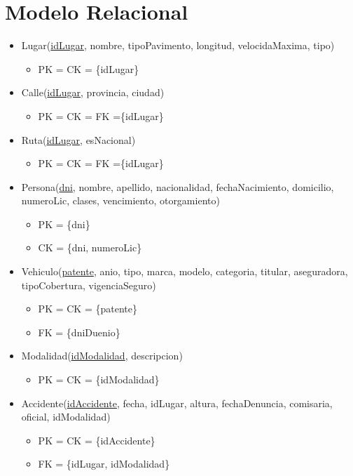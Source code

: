 \section{Modelo Relacional}

\begin{itemize}

\item Lugar(\underline{idLugar}, nombre, tipoPavimento, longitud, velocidaMaxima, tipo)
  \begin{itemize}
  \item[] PK = CK = \{idLugar\}
  \end{itemize}


\item Calle(\underline{idLugar}, provincia, ciudad)
  \begin{itemize}
  \item[] PK = CK = FK =\{idLugar\}
  \end{itemize}


\item Ruta(\underline{idLugar}, esNacional)
  \begin{itemize}
  \item[] PK = CK = FK =\{idLugar\}
  \end{itemize}


\item Persona(\underline{dni}, nombre, apellido, nacionalidad, fechaNacimiento, domicilio, numeroLic, clases, vencimiento, otorgamiento)
  \begin{itemize}
  \item[] PK = \{dni\}
  \item[] CK = \{dni, numeroLic\}
  \end{itemize}


\item Vehiculo(\underline{patente}, anio, tipo, marca, modelo, categoria, titular, aseguradora, tipoCobertura, vigenciaSeguro)
\begin{itemize}
  \item[] PK = CK = \{patente\}
  \item[] FK = \{dniDuenio\}
  \end{itemize}


\item Modalidad(\underline{idModalidad}, descripcion)
  \begin{itemize}
  \item[] PK = CK = \{idModalidad\}
  \end{itemize}


\item Accidente(\underline{idAccidente}, fecha, idLugar, altura, fechaDenuncia, comisaria, oficial, idModalidad)
  \begin{itemize}
  \item[] PK = CK = \{idAccidente\}
  \item[] FK = \{idLugar, idModalidad\}
  \end{itemize}


\end{itemize}
